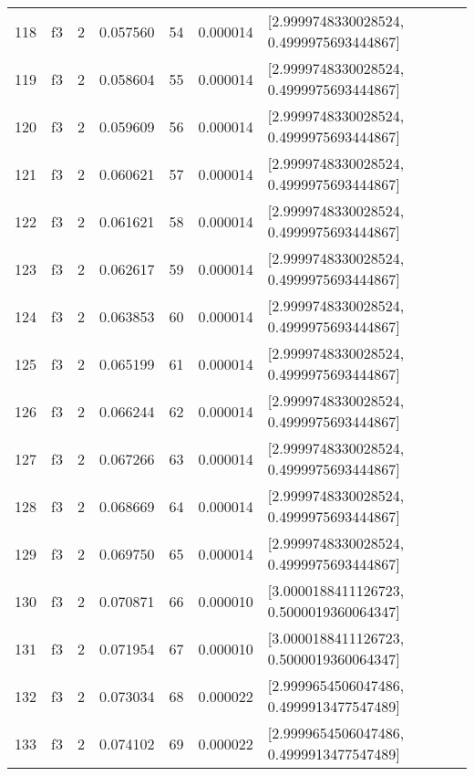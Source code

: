 \begin{tabular}{lllrlrl}
118 &  f3 &   2 &  0.057560 &   54 &  0.000014 &   [2.9999748330028524, 0.4999975693444867] \\
119 &  f3 &   2 &  0.058604 &   55 &  0.000014 &   [2.9999748330028524, 0.4999975693444867] \\
120 &  f3 &   2 &  0.059609 &   56 &  0.000014 &   [2.9999748330028524, 0.4999975693444867] \\
121 &  f3 &   2 &  0.060621 &   57 &  0.000014 &   [2.9999748330028524, 0.4999975693444867] \\
122 &  f3 &   2 &  0.061621 &   58 &  0.000014 &   [2.9999748330028524, 0.4999975693444867] \\
123 &  f3 &   2 &  0.062617 &   59 &  0.000014 &   [2.9999748330028524, 0.4999975693444867] \\
124 &  f3 &   2 &  0.063853 &   60 &  0.000014 &   [2.9999748330028524, 0.4999975693444867] \\
125 &  f3 &   2 &  0.065199 &   61 &  0.000014 &   [2.9999748330028524, 0.4999975693444867] \\
126 &  f3 &   2 &  0.066244 &   62 &  0.000014 &   [2.9999748330028524, 0.4999975693444867] \\
127 &  f3 &   2 &  0.067266 &   63 &  0.000014 &   [2.9999748330028524, 0.4999975693444867] \\
128 &  f3 &   2 &  0.068669 &   64 &  0.000014 &   [2.9999748330028524, 0.4999975693444867] \\
129 &  f3 &   2 &  0.069750 &   65 &  0.000014 &   [2.9999748330028524, 0.4999975693444867] \\
130 &  f3 &   2 &  0.070871 &   66 &  0.000010 &   [3.0000188411126723, 0.5000019360064347] \\
131 &  f3 &   2 &  0.071954 &   67 &  0.000010 &   [3.0000188411126723, 0.5000019360064347] \\
132 &  f3 &   2 &  0.073034 &   68 &  0.000022 &   [2.9999654506047486, 0.4999913477547489] \\
133 &  f3 &   2 &  0.074102 &   69 &  0.000022 &   [2.9999654506047486, 0.4999913477547489] \\
\bottomrule
\end{tabular}

